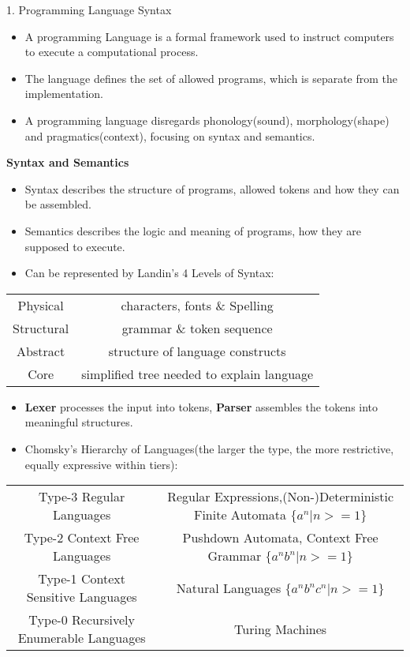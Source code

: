 \begin{center}
     \Large{1. Programming Language Syntax}
\end{center}
\begin{itemize}
    \item A programming Language is a formal framework used to instruct computers to execute a computational process.
    \item The language defines the set of allowed programs, which is separate from the implementation. 
    \item A programming language disregards phonology(sound), morphology(shape) and pragmatics(context), focusing on syntax and semantics.
\end{itemize}

\begin{center}
     \textbf{Syntax and Semantics}
\end{center}
\begin{itemize}
    \item Syntax describes the structure of programs, allowed tokens and how they can be assembled.
    \item Semantics describes the logic and meaning of programs, how they are supposed to execute.
    \item Can be represented by Landin's 4 Levels of Syntax:
\end{itemize}
\begin{center}
    \begin{tabular}{ c c }
    \hline
    Physical & characters, fonts \& Spelling \\
    \rowcolor{yellow}
    Structural & grammar \& token sequence \\
    Abstract & structure of language constructs  \\
    \rowcolor{yellow}
    Core & simplified tree needed to explain language  \\
    \hline
    \end{tabular}
\end{center}
\begin{itemize}
    \item \textbf{Lexer} processes the input into tokens, \textbf{Parser} assembles the tokens into meaningful structures.
    \item Chomsky's Hierarchy of Languages(the larger the type, the more restrictive, equally expressive within tiers):
\end{itemize}
\begin{center}
    \begin{tabular}{ c c }
    \hline
    Type-3 Regular Languages & Regular Expressions,\newline(Non-)Deterministic Finite Automata \(\{a^n|n>= 1\}\) \\
    \rowcolor{yellow}
    Type-2 Context Free Languages & Pushdown Automata, Context Free Grammar \(\{a^nb^n|n>= 1\}\) \\
    Type-1 Context Sensitive Languages & Natural Languages \(\{a^nb^nc^n|n>= 1\}\) \\
    \rowcolor{yellow}
    Type-0 Recursively Enumerable Languages & Turing Machines \\
    \hline
    \end{tabular}
\end{center}
